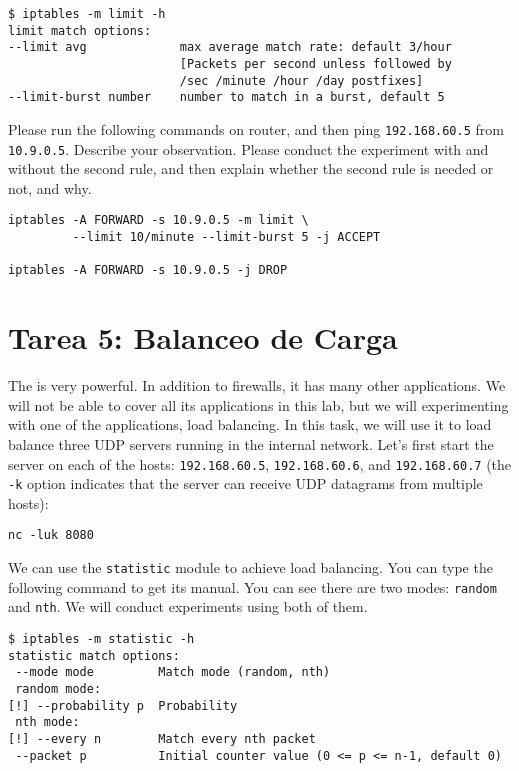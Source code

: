 \begin{lstlisting}
$ iptables -m limit -h
limit match options:
--limit avg             max average match rate: default 3/hour
                        [Packets per second unless followed by
                        /sec /minute /hour /day postfixes]
--limit-burst number    number to match in a burst, default 5
\end{lstlisting}
 

Please run the following commands on router, and then
ping \texttt{192.168.60.5} from \texttt{10.9.0.5}.  
Describe your observation. 
Please conduct the experiment with and without the second rule, 
and then explain whether the second rule is needed or not, and why.

\begin{lstlisting}
iptables -A FORWARD -s 10.9.0.5 -m limit \
         --limit 10/minute --limit-burst 5 -j ACCEPT

iptables -A FORWARD -s 10.9.0.5 -j DROP
\end{lstlisting}



\section{Tarea 5: Balanceo de Carga}

The \iptables is very powerful. In addition to firewalls,
it has many other applications. We will not be able to 
cover all its applications in this lab, but we will experimenting
with one of the applications, load balancing. In this task,
we will use it to load balance three UDP servers running in the 
internal network. Let's first start the server
on each of the hosts: \texttt{192.168.60.5}, \texttt{192.168.60.6}, and 
\texttt{192.168.60.7} (the \texttt{-k} option indicates that 
the server can receive UDP datagrams from multiple hosts):

\begin{lstlisting}
nc -luk 8080
\end{lstlisting}

We can use the \texttt{statistic} module to achieve load balancing. 
You can type the following command to get its manual. You can 
see there are two modes: \texttt{random} and \texttt{nth}. 
We will conduct experiments using both of them.

\begin{lstlisting}
$ iptables -m statistic -h 
statistic match options:
 --mode mode         Match mode (random, nth)
 random mode:
[!] --probability p  Probability
 nth mode:
[!] --every n        Match every nth packet
 --packet p          Initial counter value (0 <= p <= n-1, default 0)
\end{lstlisting}
 

